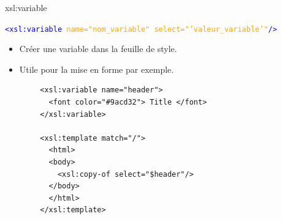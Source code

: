 \begin{frame}[fragile]{xsl:variable}
    \begin{block}{\textcolor{blue}{\texttt{<xsl:variable \textcolor{orange}{name="nom\_variable" select="'valeur\_variable'"}/>}}}
        \begin{itemize}
            \item Créer une variable dans la feuille de style.
            \item Utile pour la mise en forme par exemple.
        \end{itemize}
    \end{block}
    \begin{lstlisting}
        <xsl:variable name="header">
          <font color="#9acd32"> Title </font>
        </xsl:variable>

        <xsl:template match="/">
          <html>
          <body>
            <xsl:copy-of select="$header"/>
          </body>
          </html>
        </xsl:template>
    \end{lstlisting}
\end{frame}

